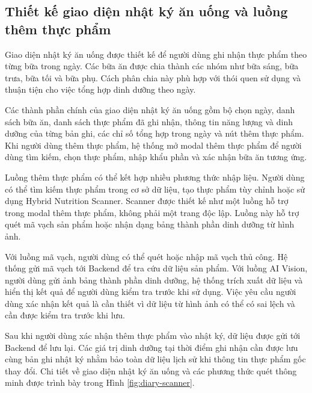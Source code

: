 \documentclass[12pt, a4paper]{report}
\begin{document}
\subsection{Thiết kế giao diện nhật ký ăn uống và luồng thêm thực phẩm}Giao diện nhật ký ăn uống được thiết kế để người dùng ghi nhận thực phẩm theo từng bữa trong ngày. Các bữa ăn được chia thành các nhóm như bữa sáng, bữa trưa, bữa tối và bữa phụ. Cách phân chia này phù hợp với thói quen sử dụng và thuận tiện cho việc tổng hợp dinh dưỡng theo ngày.

Các thành phần chính của giao diện nhật ký ăn uống gồm bộ chọn ngày, danh sách bữa ăn, danh sách thực phẩm đã ghi nhận, thông tin năng lượng và dinh dưỡng của từng bản ghi, các chỉ số tổng hợp trong ngày và nút thêm thực phẩm. Khi người dùng thêm thực phẩm, hệ thống mở modal thêm thực phẩm để người dùng tìm kiếm, chọn thực phẩm, nhập khẩu phần và xác nhận bữa ăn tương ứng.

Luồng thêm thực phẩm có thể kết hợp nhiều phương thức nhập liệu. Người dùng có thể tìm kiếm thực phẩm trong cơ sở dữ liệu, tạo thực phẩm tùy chỉnh hoặc sử dụng Hybrid Nutrition Scanner. Scanner được thiết kế như một luồng hỗ trợ trong modal thêm thực phẩm, không phải một trang độc lập. Luồng này hỗ trợ quét mã vạch sản phẩm hoặc nhận dạng bảng thành phần dinh dưỡng từ hình ảnh.

Với luồng mã vạch, người dùng có thể quét hoặc nhập mã vạch thủ công. Hệ thống gửi mã vạch tới Backend để tra cứu dữ liệu sản phẩm. Với luồng AI Vision, người dùng gửi ảnh bảng thành phần dinh dưỡng, hệ thống trích xuất dữ liệu và hiển thị kết quả để người dùng kiểm tra trước khi sử dụng. Việc yêu cầu người dùng xác nhận kết quả là cần thiết vì dữ liệu từ hình ảnh có thể có sai lệch và cần được kiểm tra trước khi lưu.

Sau khi người dùng xác nhận thêm thực phẩm vào nhật ký, dữ liệu được gửi tới Backend để lưu lại. Các giá trị dinh dưỡng tại thời điểm ghi nhận cần được lưu cùng bản ghi nhật ký nhằm bảo toàn dữ liệu lịch sử khi thông tin thực phẩm gốc thay đổi. Chi tiết về giao diện nhật ký ăn uống và các phương thức quét thông minh được trình bày trong Hình \ref{fig:diary-scanner}.
\end{document}
